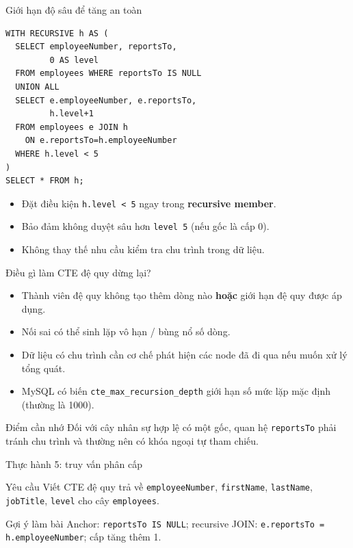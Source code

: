 \documentclass[aspectratio=169,10pt]{beamer}
\newcommand{\code}[1]{\texttt{#1}}
\begin{document}
\begin{frame}[fragile]{Giới hạn độ sâu để tăng an toàn}
\small
\begin{lstlisting}[basicstyle=\ttfamily\scriptsize]
WITH RECURSIVE h AS (
  SELECT employeeNumber, reportsTo,
         0 AS level
  FROM employees WHERE reportsTo IS NULL
  UNION ALL
  SELECT e.employeeNumber, e.reportsTo,
         h.level+1
  FROM employees e JOIN h
    ON e.reportsTo=h.employeeNumber
  WHERE h.level < 5
)
SELECT * FROM h;
\end{lstlisting}
\vspace{.1em}
\begin{itemize}
\item Đặt điều kiện \code{h.level < 5} ngay trong \textbf{recursive member}.
\item Bảo đảm không duyệt sâu hơn \code{level 5} (nếu gốc là cấp 0).
\item Không thay thế nhu cầu kiểm tra chu trình trong dữ liệu.
\end{itemize}
\end{frame}

\begin{frame}[fragile]{Điều gì làm CTE đệ quy dừng lại?}
\small
\begin{itemize}
\item Thành viên đệ quy không tạo thêm dòng nào \textbf{hoặc} giới hạn đệ quy được áp dụng.
\item Nối sai có thể sinh lặp vô hạn / bùng nổ số dòng.
\item Dữ liệu có chu trình cần cơ chế phát hiện các node đã đi qua nếu muốn xử lý tổng quát.
\item MySQL có biến \code{cte\_max\_recursion\_depth} giới hạn số mức lặp mặc định (thường là 1000).
\end{itemize}
\vspace{.3em}\begin{block}{Điểm cần nhớ}
Đối với cây nhân sự hợp lệ có một gốc, quan hệ \code{reportsTo} phải tránh chu trình và thường nên có khóa ngoại tự tham chiếu.
\end{block}
\end{frame}

\begin{frame}[fragile]{Thực hành 5: truy vấn phân cấp}
\begin{block}{Yêu cầu}
Viết CTE đệ quy trả về \code{employeeNumber}, \code{firstName}, \code{lastName}, \code{jobTitle}, \code{level} cho cây \code{employees}.
\end{block}
\begin{alertblock}{Gợi ý làm bài}
Anchor: \code{reportsTo IS NULL}; recursive JOIN: \code{e.reportsTo = h.employeeNumber}; cấp tăng thêm 1.
\end{alertblock}
\end{frame}
\end{document}
